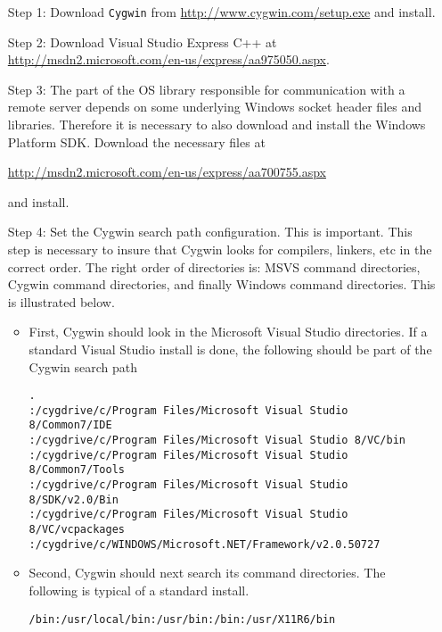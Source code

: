 \documentclass[11pt]{article}
\renewcommand{\_}{{\char"5F}}
\renewcommand{\{}{{\char"7B}}
\renewcommand{\}}{{\char"7D}}
\renewcommand{\^}{{\char"0D}}
\renewcommand{\'}{{\char"0D}}
\begin{document}
\begin{itemize}
\item[Step 1:]  Download {\tt Cygwin}  from \url{http://www.cygwin.com/setup.exe} and install.




\item[Step 2:]   Download  Visual Studio Express C++ at  \url{http://msdn2.microsoft.com/en-us/express/aa975050.aspx}.


 \item[Step 3:]  The part of the OS library responsible for communication with a remote server depends on some underlying Windows socket header files and libraries. Therefore it is necessary to also download and install the Windows Platform SDK. Download the necessary files at

 \url{http://msdn2.microsoft.com/en-us/express/aa700755.aspx}

 and install.



\item[Step 4:]  Set the Cygwin search path configuration. This is important.
This step is necessary to insure that Cygwin   looks for compilers, linkers, etc in the correct order.  The right order of directories  is: MSVS command directories, Cygwin command directories, and finally Windows command directories.  This is illustrated below.

\begin{itemize}

 \item First, Cygwin should look in the Microsoft Visual Studio directories.  If a standard Visual Studio install is done, the following  should be part of the Cygwin search path

\begin{verbatim}
.
:/cygdrive/c/Program Files/Microsoft Visual Studio 8/Common7/IDE
:/cygdrive/c/Program Files/Microsoft Visual Studio 8/VC/bin
:/cygdrive/c/Program Files/Microsoft Visual Studio 8/Common7/Tools
:/cygdrive/c/Program Files/Microsoft Visual Studio 8/SDK/v2.0/Bin
:/cygdrive/c/Program Files/Microsoft Visual Studio 8/VC/vcpackages
:/cygdrive/c/WINDOWS/Microsoft.NET/Framework/v2.0.50727
\end{verbatim}

\item Second, Cygwin should next search its  command directories.  The following is typical of a standard install.

\begin{verbatim}
/bin:/usr/local/bin:/usr/bin:/bin:/usr/X11R6/bin
\end{verbatim}


\end{itemize}
\end{itemize}
\end{document}
